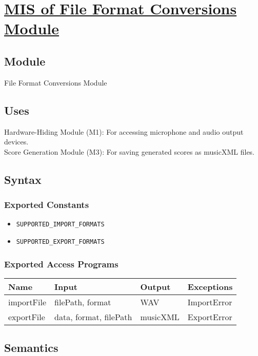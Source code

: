 \documentclass[12pt, titlepage]{article}
\begin{document}
\section{\hyperref[mFFC]{MIS of File Format Conversions Module}} \label{M6}  

\subsection{Module}  
File Format Conversions Module
\subsection{Uses} 
Hardware-Hiding Module (M1): For accessing microphone and audio output devices. \\
Score Generation Module (M3): For saving generated scores as musicXML files. \\

\subsection{Syntax}  

\subsubsection{Exported Constants}  
\begin{itemize}
    \item \texttt{SUPPORTED\_IMPORT\_FORMATS}  
    \item \texttt{SUPPORTED\_EXPORT\_FORMATS}  
\end{itemize}  

\subsubsection{Exported Access Programs}  
\begin{center}  
\begin{tabular}{|p{3cm}|p{4cm}|p{4cm}|p{3.5cm}|}  
\hline  
\textbf{Name} & \textbf{Input} & \textbf{Output} & \textbf{Exceptions} \\  
\hline  
importFile & filePath, format & WAV & ImportError \\  
exportFile & data, format, filePath & musicXML & ExportError \\  
\hline  
\end{tabular}  
\end{center}  

\subsection{Semantics}  
\end{document}
